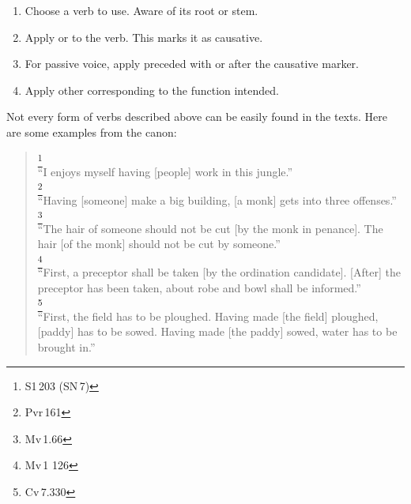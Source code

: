 \begin{enumerate}
\item Choose a verb to use. Aware of its root or stem.
\item Apply  or  to the verb. This marks it as causative.
\item For passive voice, apply  preceded with  or  after the causative marker.
\item Apply other  corresponding to the function intended.
\end{enumerate}

Not every form of verbs described above can be easily found in the texts. Here are some examples from the canon:

\begin{quote}
\footnote{S1\,203 (SN\,7)}\\
``I enjoys myself having [people] work in this jungle.''\\[1.5mm]
\footnote{Pvr\,161}\\
``Having [someone] make a big building, [a monk] gets into three offenses.''\\[1.5mm]
\footnote{Mv\,1.66}\\
``The hair of someone should not be cut [by the monk in penance]. The hair [of the monk] should not be cut by someone.''\\[1.5mm]
\footnote{Mv\,1 126}\\
``First, a preceptor shall be taken [by the ordination candidate]. [After] the preceptor has been taken, about robe and bowl shall be informed.''\\[1.5mm]
\footnote{Cv\,7.330}\\
``First, the field has to be ploughed. Having made [the field] ploughed, [paddy] has to be sowed. Having made [the paddy] sowed, water has to be brought in.''\\[1.5mm]

\end{quote}
